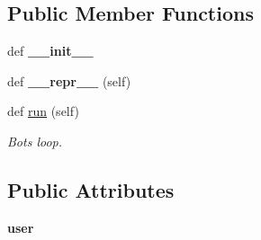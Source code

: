 \subsection*{Public Member Functions}
\begin{DoxyCompactItemize}
\item 
\mbox{\label{classtwitter_1_1bots_1_1twitter__bot_1_1TwitterBot_a19e4ba96300342dd63980717852a30b3}} 
def {\bfseries \+\_\+\+\_\+init\+\_\+\+\_\+}
\item 
\mbox{\label{classtwitter_1_1bots_1_1twitter__bot_1_1TwitterBot_a599499bf98dd54aeb95938c18086477f}} 
def {\bfseries \+\_\+\+\_\+repr\+\_\+\+\_\+} (self)
\item 
def \hyperlink{classtwitter_1_1bots_1_1twitter__bot_1_1TwitterBot_aa0425e1810fa53dab90ca0e9d7b973d1}{run} (self)
\begin{DoxyCompactList}\small\item\em Bot\textquotesingle{}s loop. \end{DoxyCompactList}\end{DoxyCompactItemize}
\subsection*{Public Attributes}
\begin{DoxyCompactItemize}
\item 
\mbox{\label{classtwitter_1_1bots_1_1twitter__bot_1_1TwitterBot_af7ed1ab8062dc7e29dbf8ced90b6ca3c}} 
{\bfseries user}
\end{DoxyCompactItemize}
